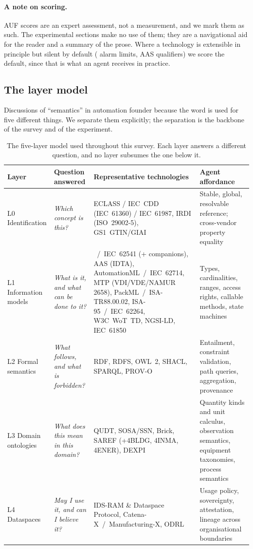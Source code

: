 \paragraph{A note on scoring.} AUF scores are an expert assessment, not a
measurement, and we mark them as such. The experimental sections make no use of
them; they are a navigational aid for the reader and a summary of the prose.
Where a technology is extensible in principle but silent by default (\opcua{}
alarm limits, AAS qualifiers) we score the default, since that is what an agent
receives in practice.

\subsection{The layer model}
\label{sec:layers}

Discussions of ``semantics'' in automation founder because the word is used for
five different things. We separate them explicitly; the separation is the
backbone of the survey and of the experiment.

\begin{table}[t]
\centering
\caption{The five-layer model used throughout this survey. Each layer answers a
different question, and no layer subsumes the one below it.}
\label{tab:layers}
\footnotesize
\setlength{\tabcolsep}{4pt}
\begin{tabular}{@{}L{1.9cm}L{2.6cm}L{6.0cm}L{4.4cm}@{}}
\toprule
\textbf{Layer} & \textbf{Question answered} & \textbf{Representative technologies} &
\textbf{Agent affordance} \\
\midrule
L0 Identification &
\emph{Which concept is this?} &
ECLASS / IEC~CDD (IEC~61360) / IEC~61987, IRDI (ISO~29002-5),
GS1~GTIN/GIAI &
Stable, global, resolvable reference; cross-vendor property equality \\[3pt]

L1 Information models &
\emph{What is it, and what can be done to it?} &
\opcua{}~/~IEC~62541 (+ companions), AAS (IDTA), AutomationML~/~IEC~62714,
MTP (VDI/VDE/NAMUR 2658), PackML~/~ISA-TR88.00.02, ISA-95~/~IEC~62264,
W3C~WoT~TD, NGSI-LD, IEC~61850 &
Types, cardinalities, ranges, access rights, callable methods, state machines \\[3pt]

L2 Formal semantics &
\emph{What follows, and what is forbidden?} &
RDF, RDFS, OWL~2, SHACL, SPARQL, PROV-O &
Entailment, constraint validation, path queries, aggregation, provenance \\[3pt]

L3 Domain ontologies &
\emph{What does this mean in \emph{this} domain?} &
QUDT, SOSA/SSN, Brick, SAREF (+4BLDG, 4INMA, 4ENER), DEXPI &
Quantity kinds and unit calculus, observation semantics, equipment taxonomies,
process semantics \\[3pt]

L4 Dataspaces &
\emph{May I use it, and can I believe it?} &
IDS-RAM \& Dataspace Protocol, Catena-X~/~Manufacturing-X, ODRL &
Usage policy, sovereignty, attestation, lineage across organisational boundaries \\
\bottomrule
\end{tabular}
\end{table}


